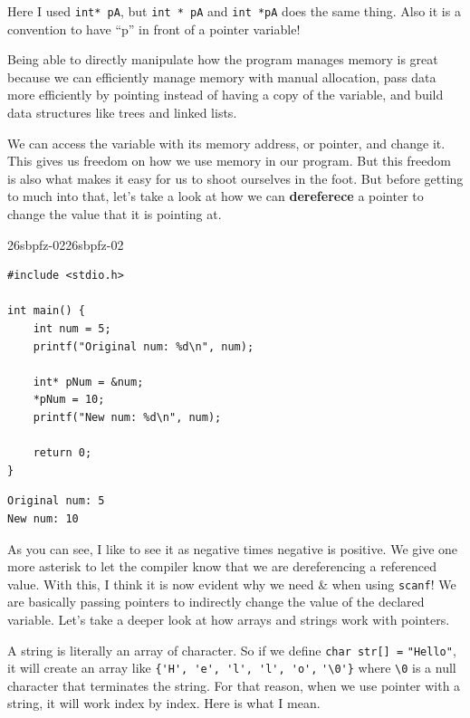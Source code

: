 \documentclass[../../../main.tex]{subfiles}
\begin{document}
Here I used \verb|int* pA|, but \verb|int * pA| and \verb|int *pA|
does the same thing. Also it is a convention to have ``p'' in front
of a pointer variable!

Being able to directly manipulate how the program manages memory
is great because we can efficiently manage memory with manual
allocation, pass data more efficiently by pointing instead of
having a copy of the variable, and build data structures like trees
and linked lists.

We can access the variable with its memory address, or pointer,
and change it. This gives us freedom on how we use memory in our
program. But this freedom is also what makes it easy for us to shoot
ourselves in the foot. But before getting to much into that,
let's take a look at how we can \textbf{dereferece} a pointer to
change the value that it is pointing at.

\begin{cbox}{26sbpfz-02}{26sbpfz-02}
\begin{lstlisting}[style=cstyle]
#include <stdio.h>

int main() {
    int num = 5;
    printf("Original num: %d\n", num);

    int* pNum = &num;
    *pNum = 10;
    printf("New num: %d\n", num);

    return 0;
}
\end{lstlisting}
\end{cbox}
\begin{outputbox}
\begin{lstlisting}[style=basic]
Original num: 5
New num: 10
\end{lstlisting}
\end{outputbox}

As you can see, I like to see it as negative times negative is
positive. We give one more asterisk to let the compiler know that
we are dereferencing a referenced value. With this, I think it is
now evident why we need \& when using \verb|scanf|! We are basically
passing pointers to indirectly change the value of the declared
variable. Let's take a deeper look at how arrays and strings work
with pointers.

A string is literally an array of character. So if we define
\verb|char str[] =| \verb|"Hello"|, it will create an array like
\verb|{'H', 'e', 'l', 'l', 'o',| \verb|'\0'}| where \verb|\0| is
a null character that terminates the string. For that reason,
when we use pointer with a string, it will work index by index.
Here is what I mean.
\end{document}
